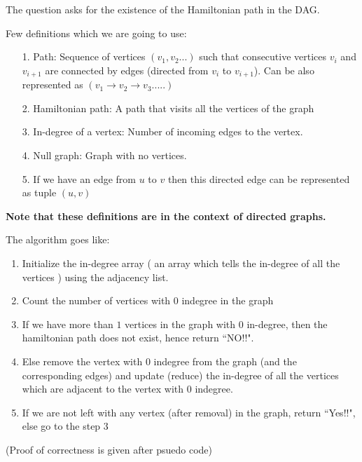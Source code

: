 \documentclass[answers]{exam}
\begin{document}
\begin{questions}
\begin{enumerate}
\begin{solution}

The question asks for the existence of the Hamiltonian path in the DAG.

Few definitions which we are going to use:
\begin{enumerate}
    \item [1.] Path: Sequence of vertices $(v_1,v_2...)$ such that consecutive vertices $v_i$ and $v_{i+1}$ are connected by edges (directed from $v_i$ to $v_{i+1}$).
    Can be also represented as $(v_1\rightarrow  v_2 \rightarrow v_3.....)$
    \item [2.]Hamiltonian path: A path that visits all the vertices of the graph
    \item [3.]In-degree of a vertex: Number of incoming edges to the vertex.
    \item [4.]Null graph: Graph with no vertices.
    \item [5.] If we have an edge from $u$ to $v$ then this directed edge can be represented as tuple $(u,v)$
\end{enumerate}
\textbf{Note that these definitions are in the context of directed graphs.}\par


The algorithm goes like:

\begin{enumerate}
    \item Initialize the in-degree array ( an array which tells the in-degree of all the vertices ) using the adjacency list.
    \item Count the number of vertices with $0$ indegree in the graph
    \item If we have more than $1$ vertices in the graph with $0$ in-degree, then the hamiltonian path does not exist, hence return ``NO!!". 
    \item Else remove the vertex with $0$ indegree from the graph (and the corresponding edges) and update (reduce) the in-degree of all the vertices which are adjacent to the vertex with $0$ indegree.
    \item If we are not left with any vertex (after removal) in the graph, return ``Yes!!", else go to the step 3    
\end{enumerate}

(Proof of correctness is given after psuedo code)


\end{solution}
\end{enumerate}
\end{questions}
\end{document}
